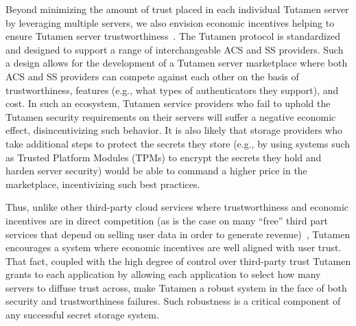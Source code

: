 Beyond minimizing the amount of trust placed in each individual
Tutamen server by leveraging multiple servers, we also envision
economic incentives helping to ensure Tutamen server
trustworthiness~\cite{anderson2001}. The Tutamen protocol is
standardized and designed to support a range of interchangeable ACS
and SS providers. Such a design allows for the development of a
Tutamen server marketplace where both ACS and SS providers can compete
against each other on the basis of trustworthiness, features (e.g.,
what types of authenticators they support), and cost. In such an
ecosystem, Tutamen service providers who fail to uphold the Tutamen
security requirements on their servers will suffer a negative economic
effect, disincentivizing such behavior. It is also likely that storage
providers who take additional steps to protect the secrets they store
(e.g., by using systems such as Trusted Platform Modules (TPMs) to
encrypt the secrets they hold and harden server security) would be
able to command a higher price in the marketplace, incentivizing such
best practices.

Thus, unlike other third-party cloud services where trustworthiness
and economic incentives are in direct competition (as is the case on
many ``free'' third part services that depend on selling user data in
order to generate revenue)~\cite{flowerday2006}, Tutamen encourages a
system where economic incentives are well aligned with user
trust. That fact, coupled with the high degree of control over
third-party trust Tutamen grants to each application by allowing each
application to select how many servers to diffuse trust across, make
Tutamen a robust system in the face of both security and
trustworthiness failures. Such robustness is a critical component of
any successful secret storage system.


